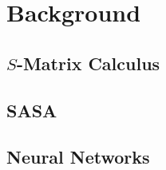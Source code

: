 \section{Background} \label{sec:background}

\subsection{$S$-Matrix Calculus} \label{sec:s_mats}

\clearpage

\subsection{SASA}\label{sec:SASA}

\clearpage

\subsection{Neural Networks} \label{sec:NN_bg}

